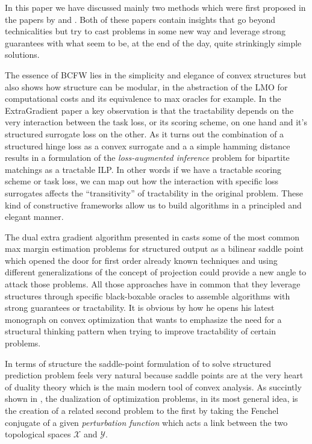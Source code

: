 In this paper we have discussed mainly two methods which were first proposed in
the papers by \citet{taskarStructuredPredictionDual2006} and
\citet{lacoste-julienBlockCoordinateFrankWolfeOptimization2013}. Both of these
papers contain insights that go beyond technicalities but try to cast problems
in some new way and leverage strong guarantees with what seem to be, at the end
of the day, quite strinkingly simple solutions.

The essence of BCFW lies in the simplicity and elegance of convex structures but
also shows how structure can be modular, in the abstraction of the LMO for
computational costs and its equivalence to max oracles for example. In the
ExtraGradient paper a key observation is that the tractability depends on the
very interaction between the task loss, or its scoring scheme, on one hand and
it's structured surrogate loss on the other. As it turns out the combination of
a structured hinge loss as a convex surrogate and a a simple hamming distance
results in a formulation of the \emph{loss-augmented inference} problem for
bipartite matchings as a tractable ILP. In other words if we have a tractable
scoring scheme or task loss, we can map out how the interaction with specific
loss surrogates affects the ``transitivity'' of tractability in the original
problem. These kind of constructive frameworks allow us to build algorithms in a
principled and elegant manner.

The dual extra gradient algorithm presented in
\citet{taskarStructuredPredictionDual2006} casts some of the most common max
margin estimation problems for structured output as a bilinear saddle point
which opened the door for first order already known techniques and using
different generalizations of the concept of projection could provide a new angle
to attack those problems. All those approaches have in common that they leverage
structures through specific black-boxable oracles to assemble algorithms with
strong guarantees or tractability. It is obvious by how he opens his latest
monograph on convex optimization that
\citet{nesterovLecturesConvexOptimization2018} wants to emphasize the need for a
structural thinking pattern when trying to improve tractability of certain
problems.


\clearpage
In terms of structure the saddle-point formulation of
\citet{taskarStructuredPredictionDual2006} to solve structured prediction
problem feels very natural because saddle points are at the very heart of
duality theory which is the main modern tool of convex analysis. As succintly
shown in \cite{botConjugateDualityConvex2010}, the dualization of optimization
problems, in its most general idea, is the creation of a related second problem
to the first by taking the Fenchel conjugate of a given \emph{perturbation
function} which acts a link between the two topological spaces $\mathcal X$ and
$\mathcal Y$.

